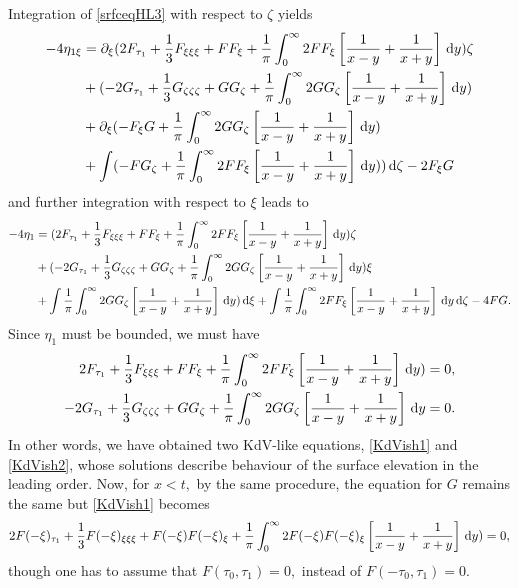 \documentclass[10pt,reqno,oneside,a4paper, landscape]{article}
\begin{document}
Integration of \eqref{srfceqHL3} with respect to $\zeta$ yields
\begin{align*}
- 4\eta_{1\xi} &= \partial_\xi (2F_{\tau_1} + \frac{1}{3}F_{\xi\xi\xi} + F F_{\xi} +  \frac{1}{\pi} \int_0^\infty 2FF_\xi \left[ \frac{1}{x-y} + \frac{1}{x+y} \right] \,\mathrm{d} y)\zeta \\
&+ (- 2G_{\tau_1} +  \frac{1}{3} G_{\zeta\zeta\zeta}+ G G_{\zeta}  + \frac{1}{\pi} \int_0^\infty 2GG_\zeta \left[ \frac{1}{x-y} + \frac{1}{x+y} \right] \,\mathrm{d} y) \\
&+ \partial_{\xi}( - F_{\xi}G + \frac{1}{\pi} \int_0^\infty 2GG_\zeta \left[ \frac{1}{x-y} + \frac{1}{x+y} \right] \,\mathrm{d} y) \\
&+ \int (- F G_{\zeta} +  \frac{1}{\pi} \int_0^\infty 2FF_\xi \left[ \frac{1}{x-y} + \frac{1}{x+y} \right] \,\mathrm{d} y))\,\mathrm{d} \zeta - 2 F_{\xi}G
\end{align*}
and further integration with respect to $\xi$ leads to
\begin{align*}
- 4\eta_1 &= (2F_{\tau_1} + \frac{1}{3}F_{\xi\xi\xi} + F F_{\xi} +  \frac{1}{\pi} \int_0^\infty 2FF_\xi \left[ \frac{1}{x-y} + \frac{1}{x+y} \right] \,\mathrm{d} y)\zeta \\
&+ (- 2G_{\tau_1} +  \frac{1}{3} G_{\zeta\zeta\zeta}+ G G_{\zeta}  + \frac{1}{\pi} \int_0^\infty 2GG_\zeta \left[ \frac{1}{x-y} + \frac{1}{x+y} \right] \,\mathrm{d} y)\xi \\
&+  \int \frac{1}{\pi} \int_0^\infty 2GG_\zeta \left[ \frac{1}{x-y} + \frac{1}{x+y} \right] \,\mathrm{d} y) \,\mathrm{d} \xi + \int \frac{1}{\pi} \int_0^\infty 2FF_\xi \left[ \frac{1}{x-y} + \frac{1}{x+y} \right] \,\mathrm{d} y \,\mathrm{d} \zeta - 4 FG.
\end{align*}
Since $\eta_1$ must be bounded, we must have 
\begin{align}
2F_{\tau_1} + \frac{1}{3}F_{\xi\xi\xi} + F F_{\xi} +  \frac{1}{\pi} \int_0^\infty 2FF_\xi \left[ \frac{1}{x-y} + \frac{1}{x+y} \right] \,\mathrm{d} y) &= 0 \label{KdVish1}, \\
-2G_{\tau_1} +  \frac{1}{3} G_{\zeta\zeta\zeta}+ G G_{\zeta}  + \frac{1}{\pi} \int_0^\infty 2GG_\zeta \left[ \frac{1}{x-y} + \frac{1}{x+y} \right] \,\mathrm{d} y &= 0. \label{KdVish2}
\end{align}
In other words, we have obtained two KdV-like equations, \eqref{KdVish1} and \eqref{KdVish2}, whose solutions describe behaviour of the surface elevation in the leading order. Now, for $x<t,$ by the same procedure, the equation for $G$ remains the same but \eqref{KdVish1} becomes
\[ 
2F(-\xi)_{\tau_1} + \frac{1}{3}F(-\xi)_{\xi\xi\xi} + F(-\xi) F(-\xi)_{\xi} +  \frac{1}{\pi} \int_0^\infty 2F(-\xi)F(-\xi)_\xi \left[ \frac{1}{x-y} + \frac{1}{x+y} \right] \,\mathrm{d} y) = 0, 
\]
though one has to assume that $F(\tau_0, \tau_1) = 0,$ instead of $F(-\tau_0, \tau_1) = 0.$
\end{document}

